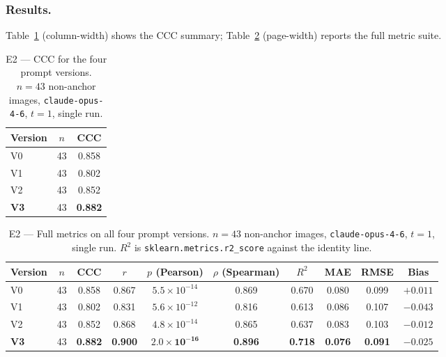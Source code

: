 \subsubsection{Results.}
Table~\ref{tab:e2-ccc} (column-width) shows the CCC summary;
Table~\ref{tab:e2-full} (page-width) reports the full metric suite.

\begin{table}[t]
  \centering
  \caption{E2 --- CCC for the four prompt versions.
    $n=43$ non-anchor images, \texttt{claude-opus-4-6}, $t=1$, single run.}
  \label{tab:e2-ccc}
  \small
  \begin{tabular*}{\linewidth}{@{\extracolsep{\fill}}lcc@{}}
    \toprule
    Version & $n$ & \textbf{CCC}\\
    \midrule
    V0          & 43 & 0.858\\
    V1          & 43 & 0.802\\
    V2          & 43 & 0.852\\
    \textbf{V3} & 43 & \textbf{0.882}\\
    \bottomrule
  \end{tabular*}
\end{table}

\begin{table}[t]
  \centering
  \caption{E2 --- Full metrics on all four prompt versions.
    $n=43$ non-anchor images, \texttt{claude-opus-4-6}, $t=1$, single run.
    $R^2$ is \texttt{sklearn.metrics.r2\_score} against the identity line.}
  \label{tab:e2-full}
  \small
  \begin{tabular*}{\textwidth}{@{\extracolsep{\fill}}lccccccccc@{}}
    \toprule
    Version & $n$ & CCC & $r$ & $p$ (Pearson) & $\rho$ (Spearman) & $R^2$ & MAE & RMSE & Bias\\
    \midrule
    V0          & 43 & 0.858 & 0.867 & $5.5\!\times\!10^{-14}$ & 0.869 & 0.670 & 0.080 & 0.099 & $+0.011$\\
    V1          & 43 & 0.802 & 0.831 & $5.6\!\times\!10^{-12}$ & 0.816 & 0.613 & 0.086 & 0.107 & $-0.043$\\
    V2          & 43 & 0.852 & 0.868 & $4.8\!\times\!10^{-14}$ & 0.865 & 0.637 & 0.083 & 0.103 & $-0.012$\\
    \textbf{V3} & 43 & \textbf{0.882} & \textbf{0.900} & $\mathbf{2.0\!\times\!10^{-16}}$ & \textbf{0.896} & \textbf{0.718} & \textbf{0.076} & \textbf{0.091} & $-0.025$\\
    \bottomrule
  \end{tabular*}
\end{table}

